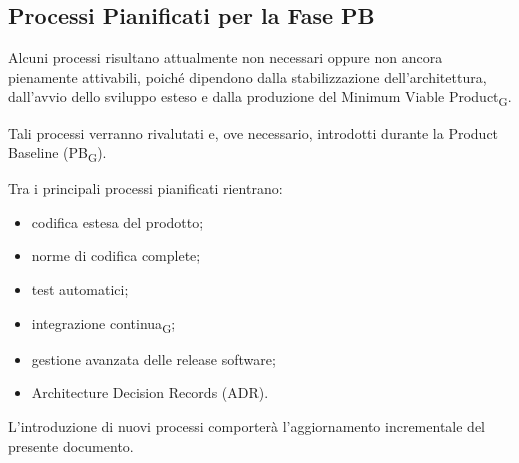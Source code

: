 
\subsection{Processi Pianificati per la Fase PB}

Alcuni processi risultano attualmente non necessari oppure non ancora pienamente
attivabili, poiché dipendono dalla stabilizzazione dell'architettura, dall'avvio
dello sviluppo esteso e dalla produzione del Minimum Viable Product\textsubscript{G}.

Tali processi verranno rivalutati e, ove necessario, introdotti durante la Product
Baseline (PB\textsubscript{G}).

Tra i principali processi pianificati rientrano:

\begin{itemize}
    \item codifica estesa del prodotto;
    \item norme di codifica complete;
    \item test automatici;
    \item integrazione continua\textsubscript{G};
    \item gestione avanzata delle release software;
    \item Architecture Decision Records (ADR).
\end{itemize}

L'introduzione di nuovi processi comporterà l'aggiornamento incrementale del
presente documento.